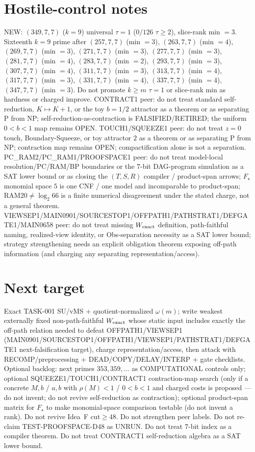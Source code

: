 \documentclass[11pt]{article}
\begin{document}
\section*{Hostile-control notes}
NEW: $(349,7,7)$ ($k{=}9$) universal $\tau{=}1$ ($0/126$ $\tau{\ge}2$), slice-rank min $=3$.
Sixteenth $k{=}9$ prime after $(257,7,7)$ (min $=3$), $(263,7,7)$ (min $=4$), $(269,7,7)$ (min $=3$), $(271,7,7)$ (min $=3$), $(277,7,7)$ (min $=3$), $(281,7,7)$ (min $=4$), $(283,7,7)$ (min $=2$), $(293,7,7)$ (min $=3$), $(307,7,7)$ (min $=4$), $(311,7,7)$ (min $=3$), $(313,7,7)$ (min $=4$), $(317,7,7)$ (min $=3$), $(331,7,7)$ (min $=4$), $(337,7,7)$ (min $=4$), $(347,7,7)$ (min $=3$).
Do not promote $k{\ge}m$ $\tau{=}1$ or slice-rank min as hardness or charged improve.
CONTRACT1 peer: do not treat standard self-reduction, $K\mapsto K+1$, or the toy $b{=}1/2$ attractor as a theorem or as separating P from NP;
self-reduction-as-contraction is FALSIFIED/RETIRED; the uniform $0{<}b{<}1$ map remains OPEN.
TOUCH1/SQUEEZE1 peer: do not treat $z{=}0$ touch, Boundary-Squeeze, or toy attractor $2$ as a theorem or as separating P from NP;
contraction map remains OPEN; compactification alone is not a separation.
PC\_RAM2/PC\_RAM1/PROOFSPACE1 peer: do not treat model-local resolution/PC/RAM/BP boundaries or the $7$-bit DAG-program simulation as a SAT lower bound
or as closing the $(T,S,R)$ compiler / product-span arrows; $F_\star$ monomial space $5$ is one CNF / one model and incomparable to product-span;
RAM$20\neq\log_2 66$ is a finite numerical disagreement under the stated charge, not a general theorem.
VIEWSEP1/MAIN0901/SOURCESTOP1/OFFPATH1/PATHSTRAT1/DEFGATE1/MAIN0658 peer: do not treat missing $W_{\rm exact}$ definition,
path-faithful naming, realized-view identity, or Obs-separation necessity as a SAT lower bound;
strategy strengthening needs an explicit obligation theorem exposing off-path information
(and charging any separating representation/access).

\section*{Next target}
Exact TASK-001 SU/vMS + quotient-normalized $\omega(m)$; write weakest externally fixed non-path-faithful
$W_{\rm exact}$ whose static input includes exactly the off-path relation needed to defeat OFFPATH1/VIEWSEP1
(MAIN0901/SOURCESTOP1/OFFPATH1/VIEWSEP1/PATHSTRAT1/DEFGATE1 next-falsification target), charge representation/access,
then attack with RECOMP/preprocessing + DEAD/COPY/DELAY/INTERP + gate checklists.
Optional backlog: next primes $353,359,\ldots$ as COMPUTATIONAL controls only;
optional SQUEEZE1/TOUCH1/CONTRACT1 contraction-map search (only if a concrete $M,b$ / $a,b$ with $\rho(M){\lt}1$ / $0{<}b{<}1$ and charged costs is proposed --- do not invent; do not revive self-reduction as contraction);
optional product-span matrix for $F_\star$ to make monomial-space comparison testable (do not invent a rank).
Do not revive Idea~F cut$\ge48$. Do not strengthen peer labels.
Do not re-claim TEST-PROOFSPACE-D48 as UNRUN.
Do not treat $7$-bit index as a compiler theorem.
Do not treat CONTRACT1 self-reduction algebra as a SAT lower bound.
\end{document}
